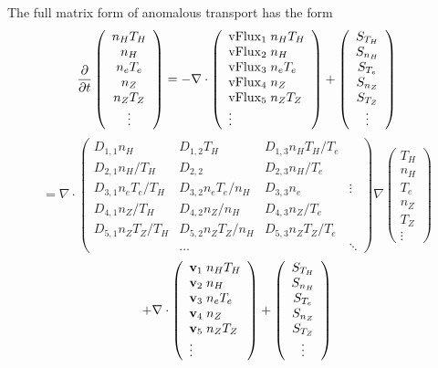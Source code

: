 The full matrix form of anomalous transport has the form
$$ \frac{\partial}{\partial t}
 \left( \begin{array}{c} n_H T_H  \\ n_H \\ n_e T_e \\
    n_Z \\ n_Z T_Z \\ \vdots
    \end{array} \right)
 = - \nabla \cdot
\left( \begin{array}{l} {\rm vFlux}_1 \; n_H T_H \\
 {\rm vFlux}_2 \; n_H \\
 {\rm vFlux}_3 \; n_e T_e \\
 {\rm vFlux}_4 \; n_Z \\
 {\rm vFlux}_5 \; n_Z T_Z \\
 \vdots \end{array} \right)
 + \left( \begin{array}{c} S_{T_H} \\ S_{n_H} \\ S_{T_e} \\
    S_{n_Z} \\ S_{T_Z} \\ \vdots
    \end{array} \right)
$$
$$
 = \nabla \cdot
\left( \begin{array}{llll}
D_{1,1} n_H & D_{1,2} T_H & D_{1,3} n_H T_H / T_e \\
D_{2,1} n_H / T_H & D_{2,2} & D_{2,3} n_H / T_e \\
D_{3,1} n_e T_e / T_H & D_{3,2} n_e T_e / n_H & D_{3,3} n_e & \vdots \\
D_{4,1} n_Z / T_H & D_{4,2} n_Z / n_H & D_{4,3} n_Z / T_e \\
D_{5,1} n_Z T_Z / T_H & D_{5,2} n_Z T_Z / n_H &
        D_{5,3} n_Z T_Z / T_e \\
 & \ldots & & \ddots
\end{array} \right)
 \nabla
 \left( \begin{array}{c}  T_H \\ n_H \\  T_e \\
   n_Z \\  T_Z \\ \vdots
    \end{array} \right)
$$
$$
 + \nabla \cdot
\left( \begin{array}{l} {\bf v}_1 \; n_H T_H \\ {\bf v}_2 \; n_H \\
   {\bf v}_3 \; n_e T_e \\
   {\bf v}_4 \; n_Z \\ {\bf v}_5 \; n_Z T_Z \\
    \vdots \end{array} \right) +
 \left( \begin{array}{c} S_{T_H} \\ S_{n_H} \\ S_{T_e} \\
    S_{n_Z} \\ S_{T_Z} \\ \vdots
    \end{array} \right) $$
